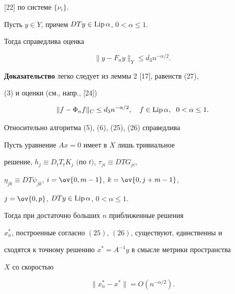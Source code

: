 [22] по системе $\{\nu_i\}$. 


 


\begin{lem} 


Пусть $y\in Y$, причем $D T y\in\operatorname{Lip}\alpha$, $0<\alpha\le1$. 


Тогда справедлива оценка 


$$ 


\|y-F_n y\|_Y\le d_3 n^{-\alpha/2}. 


$$ 


\end{lem} 


 


{\bf Доказательство} легко следует из леммы 2 [17], равенств (27), 


(3) и оценки (см., напр., [24]) 


$$ 


\|f-\Phi_n f\|_C\le d_3n^{-\alpha/2},\quad 


f\in\Lip\alpha,\ \; 0<\alpha\le1. 


$$ 


 


Относительно алгоритма (5), (6), (25), (26) справедлива 


 


\begin{thm} 


Пусть уравнение $Ax=0$ имеет в $X$ лишь тривиальное 


решение, $h_j\equiv D_t T_t K_j$ $($по $t)$, $\tau_{j 


i}\equiv D T G_{j i}$, 


$\eta_{j k}\equiv D T\psi_{j k}$, $i=\ov{0,m-1}$, $k=\ov{0,j+m-1}$, 


$j=\ov{0,p}$, $D T y\in\operatorname{Lip}\alpha$, $0{<}\alpha{\le}1$. 


Тогда при достаточно больших $n$ приближенные решения 


$x^*_n$, построенные согласно $(25)$, $(26)$, существуют, единственны и 


сходятся к точному решению $x^*=A^{-1}y$ в смысле метрики пространства 


$X$ со скоростью 


$$ 


\|x^*_n-x^*\|=O(n^{-\alpha/2}). 


$$ 


\end{thm} 


